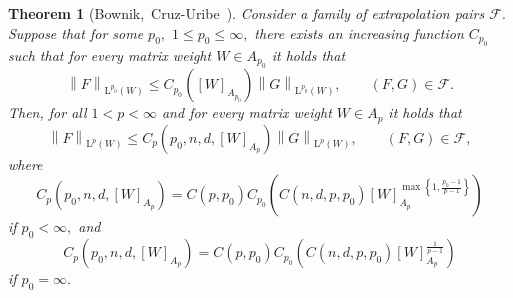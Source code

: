 \documentclass{article}
\newtheorem{lettertheorem}{Theorem}
\theoremstyle{definition}
\theoremstyle{remark}
\numberwithin{equation}{section}
\newcommand{\norm}[2]{\left\|{#1}\right\|_{{#2}}}
\newcommand{\cF}{\mathcal{F}}
\newcommand{\Lp}[1]{\mathrm{L}^{#1}}
\newcommand{\1}{\mathbf{1}}
\begin{document}
    \begin{lettertheorem}[Bownik,~Cruz-Uribe~\cite{Cruz_Uribe_Bownik_Extrapolation}]
        \label{thm:Extrapolation}
        Consider a family of extrapolation pairs $\cF.$
        Suppose that for some $p_0,$ $1 \leq p_0 \leq \infty,$ there exists an increasing function $C_{p_0}$
        such that for every matrix weight $W \in A_{p_0}$ it holds that
        \begin{equation}
            \label{eq:BootstrapInequalities}
            \norm{F}{\Lp{p_0}(W)} \leq C_{p_0}([W]_{A_{p_0}}) \norm{G}{\Lp{p_0}(W)},\qquad (F,G) \in \cF.
        \end{equation}
        Then, for all $1 < p < \infty$ and for every matrix weight $W \in A_p$ it holds that
        \begin{equation*}
            \norm{F}{\Lp{p}(W)} \leq C_{p}(p_0,n,d,[W]_{A_p}) \norm{G}{\Lp{p}(W)},\qquad (F,G) \in \cF,
        \end{equation*}
        where
        \begin{equation*}
            C_p(p_0,n,d,[W]_{A_p}) = C(p,p_0) C_{p_0}\left(C(n,d,p,p_0) [W]_{A_p}^{\max\left\{1,\frac{p_0-1}{p-1}\right\}}\right)
        \end{equation*}
        if $p_0<\infty,$ and
        \begin{equation*}
            C_p(p_0,n,d,[W]_{A_p}) = C(p,p_0) C_{p_0}\left(C(n,d,p,p_0) [W]_{A_p}^{\frac{1}{p-1}}\right)
        \end{equation*}
        if $p_0=\infty.$
    \end{lettertheorem}
\end{document}
